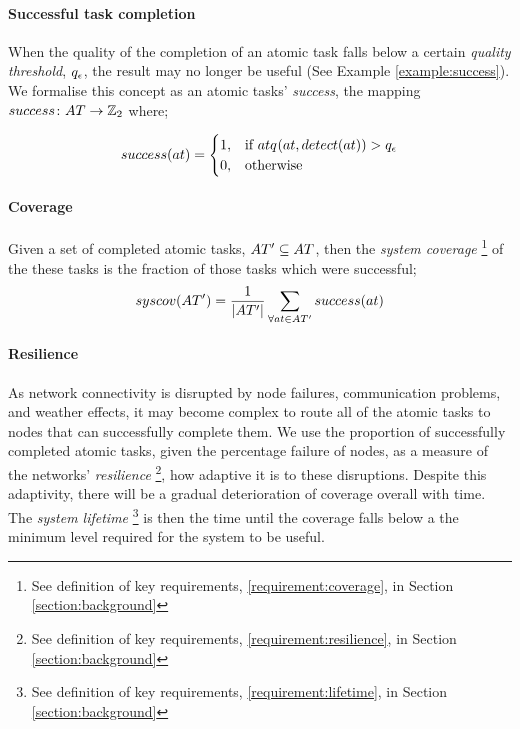 \paragraph{Successful task completion}
\label{section:success}
When the quality of the completion of an atomic task falls below a certain \textit{quality threshold}, $q_\epsilon$, the result may no longer be useful (See Example \ref{example:success}).  We formalise this concept as an atomic tasks' \textit{success}, the mapping $\formalAtomicTaskSuccess{}{}$ where;

\begin{equation}
	 \functionAtomicTaskSuccess{}{}
	 = 
	\begin{cases}
		1, & \text{if } \functionAtomicTaskQualitySensor{}{} > \varQualityMin{}{} \\
		0, & \text{otherwise}
	\end{cases}
\end{equation}

\paragraph{Coverage}
\label{section:coverage}
Given a set of completed atomic tasks, $\setAtomicTaskInstance{}{} \subseteq \setAtomicTask{}{}$, then the \textit{system coverage} \footnote{See definition of key requirements, \ref{requirement:coverage}, in Section \ref{section:background}} of the these tasks is the fraction of those tasks which were successful;
\begin{equation}
	\label{eq:coverage}
	\functionSystemCoverage{}{}
	=
	\frac{1}{\funcSize{\setAtomicTaskInstance{}{}}}
	\sum\limits_{\forall \varAtomicTask{}{} \in \setAtomicTaskInstance{}{}}
	\functionAtomicTaskSuccess{}{}
\end{equation}

\paragraph{Resilience}
\label{section:resilience}
As network connectivity is disrupted by node failures, communication problems, and weather effects, it may become complex to route all of the atomic tasks to nodes that can successfully complete them. We use the proportion of successfully completed atomic tasks, given the percentage failure of nodes, as a measure of the networks' \textit{resilience} \footnote{See definition of key requirements, \ref{requirement:resilience}, in Section \ref{section:background}}, how adaptive it is to these disruptions. Despite this adaptivity, there will be a gradual deterioration of coverage overall with time. The \textit{system lifetime} \footnote{See definition of key requirements, \ref{requirement:lifetime}, in Section \ref{section:background}} is then the time until the coverage falls below a the minimum level required for the system to be useful. 

